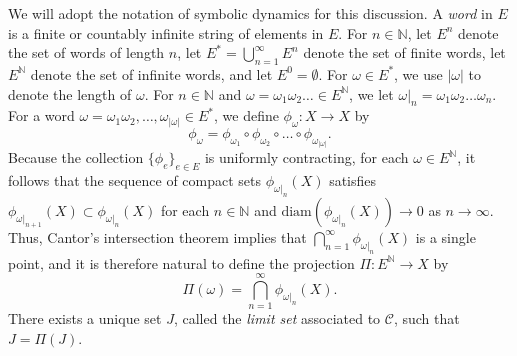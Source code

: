 \documentclass[10pt]{article}
\theoremstyle{definition}
\numberwithin{equation}{section}
\numberwithin{figure}{section}
\numberwithin{table}{section}
\begin{document}
We will adopt the notation of symbolic dynamics for this discussion. A \textit{word} in $E$ is a finite or countably infinite string of elements in $E$. For $n\in\mathbb{N}$, let $E^n$ denote the set of words of length $n$, let $E^*=\bigcup_{n=1}^\infty E^n$ denote the set of finite words, let $E^{\mathbb{N}}$ denote the set of infinite words, and let $E^0=\emptyset$. For $\omega\in E^*$, we use $|\omega|$ to denote the length of $\omega$. For $n\in\mathbb{N}$ and $\omega=\omega_1\omega_2\dots\in E^{\mathbb{N}}$, we let $\omega|_n=\omega_1\omega_2\dots\omega_n$. For a word $\omega=\omega_1\omega_2,\dots,\omega_{|\omega|}\in E^*$, we define $\phi_\omega:X\to X$ by
$$\phi_{\omega}=\phi_{\omega_1}\circ\phi_{\omega_2}\circ\dots\circ\phi_{\omega_{|\omega|}}.$$
Because the collection $\{\phi_e\}_{e\in E}$ is uniformly contracting, for each $\omega\in E^{\mathbb{N}}$, it follows that the sequence of compact sets $\phi_{\omega|_n}(X)$ satisfies $\phi_{\omega|_{n+1}}(X)\subset\phi_{\omega|_n}(X)$ for each $n\in\mathbb{N}$ and $\mathrm{diam}(\phi_{\omega|_n}(X))\to0$ as $n\to\infty$. Thus, Cantor's intersection theorem implies that $\bigcap_{n=1}^\infty \phi_{\omega|_n}(X)$ is a single point, and it is therefore natural to define the projection $\Pi:E^{\mathbb{N}}\to X$ by
$$\Pi(\omega)=\bigcap_{n=1}^\infty \phi_{\omega|_n}(X).$$
There exists a unique set $J$, called the \textit{limit set} associated to $\mathcal{C}$, such that $J=\Pi(J)$. 
\end{document}
